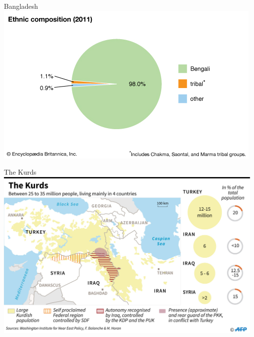 \documentclass{beamer}
\begin{document}
\begin{frame}{\LARGE Bangladesh}
    \centering
\includegraphics[width=\textwidth,height=0.8\textheight,keepaspectratio]{Bangladesh.jpg}
\end{frame}

\begin{frame}{\LARGE The Kurds}
    \centering
\includegraphics[width=\textwidth,height=0.8\textheight,keepaspectratio]{Kurds.jpg}
\end{frame}
\end{document}
